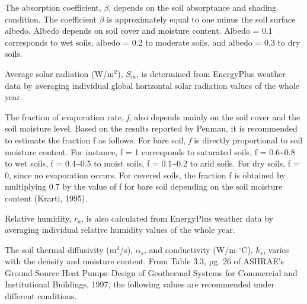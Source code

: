 The absorption coefficient, \({\beta}\), depends on the soil absorptance and shading condition. The coefficient \({\beta}\) is approximately equal to one minus the soil surface albedo. Albedo depends on soil cover and moisture content. Albedo = 0.1 corresponds to wet soils, albedo = 0.2 to moderate soils, and albedo = 0.3 to dry soils.

Average solar radiation (W/m\(^{2}\)), \(S_{m}\), is determined from EnergyPlus weather data by averaging individual global horizontal solar radiation values of the whole year.

The fraction of evaporation rate, \emph{f}, also depends mainly on the soil cover and the soil moisture level. Based on the results reported by Penman, it is recommended to estimate the fraction f as follows. For bare soil, \emph{f} is directly proportional to soil moisture content. For instance, f = 1 corresponds to saturated soils, f = 0.6\textasciitilde{}0.8 to wet soils, f = 0.4\textasciitilde{}0.5 to moist soils, f = 0.1\textasciitilde{}0.2 to arid soils. For dry soils, f = 0, since no evaporation occurs. For covered soils, the fraction f is obtained by multiplying 0.7 by the value of f for bare soil depending on the soil moisture content (Krarti, 1995).

Relative humidity, \(r_{a}\), is also calculated from EnergyPlus weather data by averaging individual relative humidity values of the whole year.

The soil thermal diffusivity (m\(^{2}\)/s), \({\alpha_{s}}\), and conductivity (W/m-\(^{\circ}\)C), \(k_{s}\), varies with the density and moisture content. From Table 3.3, pg. 26 of ASHRAE's Ground Source Heat Pumps--Design of Geothermal Systems for Commercial and Institutional Buildings, 1997, the following values are recommended under different conditions.


